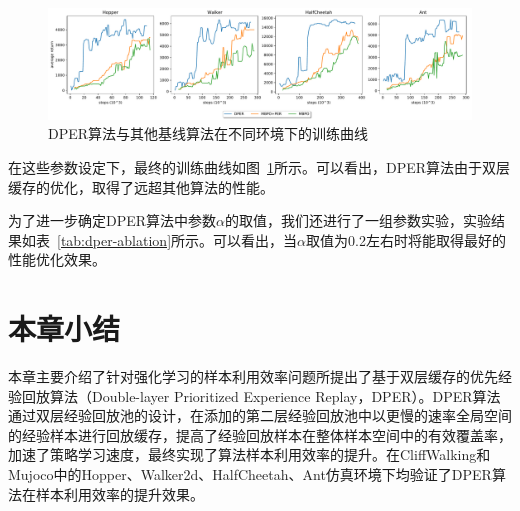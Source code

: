 \begin{figure}[H]
  \centering
  \includegraphics[width=\textwidth]{figures/dler.pdf}
  \caption{DPER算法与其他基线算法在不同环境下的训练曲线}
  \label{fig:dper-performance}
\end{figure}

在这些参数设定下，最终的训练曲线如图~\ref{fig:dper-performance}所示。可以看出，DPER算法由于双层缓存的优化，取得了远超其他算法的性能。

为了进一步确定DPER算法中参数$\alpha$的取值，我们还进行了一组参数实验，实验结果如表~\ref{tab:dper-ablation}所示。可以看出，当$\alpha$取值为0.2左右时将能取得最好的性能优化效果。

\begin{table}[ht]
\centering
{}
\caption{Result of Ablation Study}
\label{tab:dper-ablation}
\end{table}

\section{本章小结}

本章主要介绍了针对强化学习的样本利用效率问题所提出了基于双层缓存的优先经验回放算法（Double-layer Prioritized Experience Replay，DPER）。DPER算法通过双层经验回放池的设计，在添加的第二层经验回放池中以更慢的速率全局空间的经验样本进行回放缓存，提高了经验回放样本在整体样本空间中的有效覆盖率，加速了策略学习速度，最终实现了算法样本利用效率的提升。在CliffWalking和Mujoco中的Hopper、Walker2d、HalfCheetah、Ant仿真环境下均验证了DPER算法在样本利用效率的提升效果。